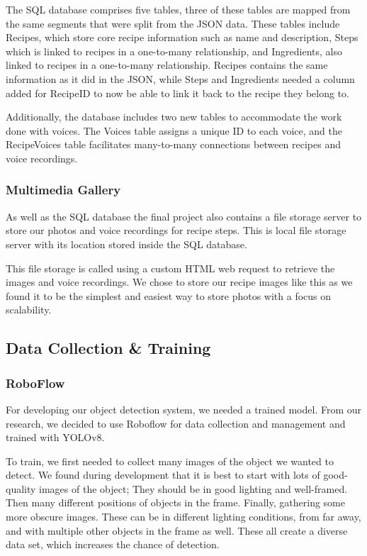 \documentclass{article}
\begin{document}
    The SQL database comprises five tables, three of these tables are mapped from the same segments that were split from the JSON data. These tables include Recipes, which store core recipe information such as name and description, Steps which is linked to recipes in a one-to-many relationship, and Ingredients, also linked to recipes in a one-to-many relationship. Recipes contains the same information as it did in the JSON, while Steps and Ingredients needed a column added for RecipeID to now be able to link it back to the recipe they belong to.
    
    Additionally, the database includes two new tables to accommodate the work done with voices. The Voices table assigns a unique ID to each voice, and the Recipe\textunderscore Voices table facilitates many-to-many connections between recipes and voice recordings.
    \subsubsection{Multimedia Gallery}\label{multimediaGallery}
    As well as the SQL database the final project also contains a file storage server to store our photos and voice recordings for recipe steps. This is local file storage server with its location stored inside the SQL database.
    
    This file storage is called using a custom HTML web request to retrieve the images and voice recordings. We chose to store our recipe images like this as we found it to be the simplest and easiest way to store photos with a focus on scalability.

    \subsection{Data Collection \& Training}
    \subsubsection{RoboFlow}
    For developing our object detection system, we needed a trained model. From our research, we decided to use Roboflow for data collection and management and trained with YOLOv8.
    
To train, we first needed to collect many images of the object we wanted to detect. We found during development that it is best to start with lots of good-quality images of the object; They should be in good lighting and well-framed. Then many different positions of objects in the frame. Finally, gathering some more obscure images. These can be in different lighting conditions, from far away, and with multiple other objects in the frame as well. These all create a diverse data set, which increases the chance of detection.
\end{document}
